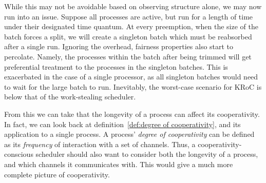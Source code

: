 While this may not be avoidable based on observing structure alone, we may now 
run into an issue. Suppose all processes are active, but run for a length of time under their
designated time quantum. At every preemption, when the size of the batch forces 
a split, we will create a singleton batch which must be reabsorbed after a 
single run. Ignoring the overhead, fairness properties also start to percolate.
Namely, the processes within the batch after being trimmed will get preferential
treatment to the processes in the singleton batches. This is exacerbated in the case of 
a single processor, as all singleton batches would need to wait for the large batch to run. 
Inevitably, the worst-case scenario for KRoC is below that of the work-stealing scheduler.

From this we can take that the longevity of a process can affect its 
cooperativity. In fact, we can look back at 
definition~\ref{def:degree of cooperativity}, and its application to a single 
process. A process' \emph{degree of cooperativity} can be defined as 
its \emph{frequency} of interaction with a set of channels.
Thus, a cooperativity-conscious scheduler should also want to consider both
the longevity of a process, and which channels it communicates with. This would
give a much more complete picture of cooperativity.

